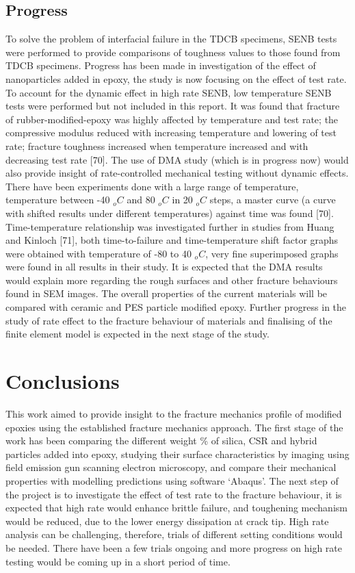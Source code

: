 \documentclass[numbers=noendperiod,chapterprefix=on]{icldt} %
\begin{document}
\subsection{Progress}
To solve the problem of interfacial failure in the TDCB specimens, SENB tests were performed to provide comparisons of toughness values to those found from TDCB specimens. Progress has been made in investigation of the effect of nanoparticles added in epoxy, the study is now focusing on the effect of test rate. 
To account for the dynamic effect in high rate SENB, low temperature SENB tests were performed but not included in this report. It was found that fracture of rubber-modified-epoxy was highly affected by temperature and test rate; the compressive modulus reduced with increasing temperature and lowering of test rate; fracture toughness increased when temperature increased and with decreasing test rate [70]. 
The use of DMA study (which is in progress now) would also provide insight of rate-controlled mechanical testing without dynamic effects. There have been experiments done with a large range of temperature, temperature between -40 $_oC$ and 80 $_oC$ in 20 $_oC$ steps, a master curve (a curve with shifted results under different temperatures) against time was found [70]. Time-temperature relationship was investigated further in studies from Huang and Kinloch [71], both time-to-failure and time-temperature shift factor graphs were obtained with temperature of -80 to 40 $_oC$, very fine superimposed graphs were found in all results in their study. It is expected that the DMA results would explain more regarding the rough surfaces and other fracture behaviours found in SEM images.
The overall properties of the current materials will be compared with ceramic and PES particle modified epoxy. Further progress in the study of rate effect to the fracture behaviour of materials and finalising of the finite element model is expected in the next stage of the study. 

\section{Conclusions}
This work aimed to provide insight to the fracture mechanics profile of modified epoxies using the established fracture mechanics approach. The first stage of the work has been comparing the different weight \% of silica, CSR and hybrid particles added into epoxy, studying their surface characteristics by imaging using field emission gun scanning electron microscopy, and compare their mechanical properties with modelling predictions using software ‘Abaqus’.
The next step of the project is to investigate the effect of test rate to the fracture behaviour, it is expected that high rate would enhance brittle failure, and toughening mechanism would be reduced, due to the lower energy dissipation at crack tip. High rate analysis can be challenging, therefore, trials of different setting conditions would be needed. There have been a few trials ongoing and more progress on high rate testing would be coming up in a short period of time.
\end{document}
